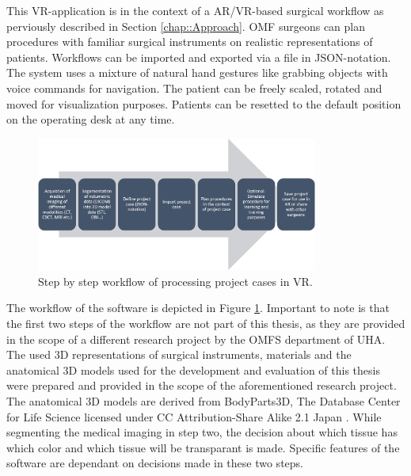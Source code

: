 This VR-application is in the context of a AR/VR-based surgical workflow as perviously described in Section \ref{chap::Approach}.
OMF surgeons can plan procedures with familiar surgical instruments on realistic representations of patients.
Workflows can be imported and exported via a file in JSON-notation.
The system uses a mixture of natural hand gestures like grabbing objects with voice commands for navigation.
The patient can be freely scaled, rotated and moved for visualization purposes.
Patients can be resetted to the default position on the operating desk at any time.

\begin{figure}[ht]
    \centering
    \includegraphics[width=350px]{images/implementation/workflow.png}
    \caption{\label{fig::ImplementationWorkflow}Step by step workflow of processing project cases in VR.}
\end{figure}

The workflow of the software is depicted in Figure \ref{fig::ImplementationWorkflow}.
Important to note is that the first two steps of the workflow are not part of this thesis, as they are provided in the scope of a different research project by the OMFS 
department of UHA.
The used 3D representations of surgical instruments, materials and the anatomical 3D models used for the development and evaluation of this thesis were prepared and provided in the scope of the aforementioned research project.
The anatomical 3D models are derived from BodyParts3D, The Database Center for Life Science licensed under CC Attribution-Share Alike 2.1 Japan \cite{mitsuhashi2009bodyparts3d}.
While segmenting the medical imaging in step two, the decision about which tissue has which color and which tissue will be transparant is made.
Specific features of the software are dependant on decisions made in these two steps.




